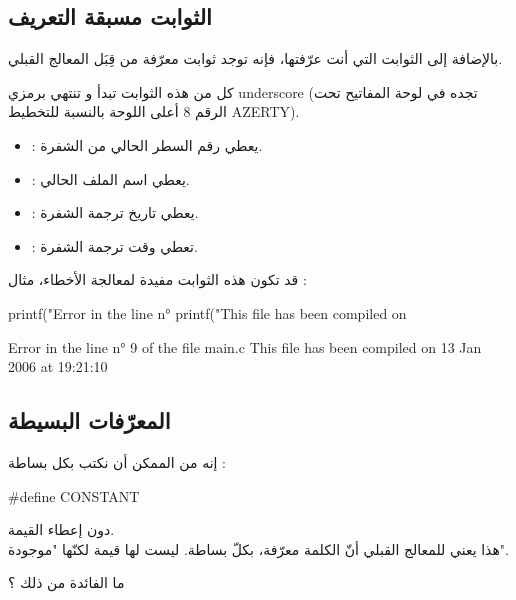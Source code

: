 \subsection{الثوابت مسبقة التعريف}

بالإضافة إلى الثوابت التي أنت عرّفتها، فإنه توجد ثوابت معرّفة من قِبَل المعالج القبلي.

كل من هذه الثوابت تبدأ و تنتهي برمزي
\textenglish{underscore} \InlineCode{\_}
(تجده في لوحة المفاتيح تحت الرقم 8 أعلى اللوحة بالنسبة للتخطيط
\textenglish{AZERTY}).

\begin{itemize}
  \item {} : يعطي رقم السطر الحالي من الشفرة.
  \item {} : يعطي اسم الملف الحالي.
  \item {} : يعطي تاريخ ترجمة الشفرة.
  \item {} : تعطي وقت ترجمة الشفرة.
\end{itemize}

قد تكون هذه الثوابت مفيدة لمعالجة الأخطاء، مثال :

\begin{Csource}
printf("Error in the line n° %
printf("This file has been compiled on %
\end{Csource}

\begin{Console}
Error in the line n° 9 of the file main.c
This file has been compiled on 13 Jan 2006 at 19:21:10
\end{Console}

\subsection{المعرّفات البسيطة}

إنه من الممكن أن نكتب بكل بساطة :

\begin{Csource}
#define CONSTANT
\end{Csource}

دون إعطاء القيمة.\\
هذا يعني للمعالج القبلي أنّ الكلمة
معرّفة، بكلّ بساطة. ليست لها قيمة لكنّها "موجودة".

\begin{question}
  ما الفائدة من ذلك ؟
\end{question}

